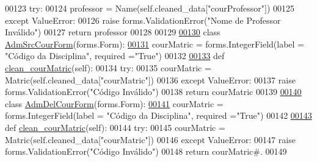 \begin{DoxyCode}
00123         \textcolor{keywordflow}{try}:
00124             professor = Name(self.cleaned\_data[\textcolor{stringliteral}{"courProfessor"}])
00125         \textcolor{keywordflow}{except} ValueError:
00126             \textcolor{keywordflow}{raise} forms.ValidationError(\textcolor{stringliteral}{"Nome de Professor Inválido"})
00127         \textcolor{keywordflow}{return} professor            
00128 
00129 
\hypertarget{Adm_2forms_8py_source_l00130}{}\hyperlink{classAdm_1_1forms_1_1AdmSrcCourForm}{00130} \textcolor{keyword}{class }\hyperlink{classAdm_1_1forms_1_1AdmSrcCourForm}{AdmSrcCourForm}(forms.Form):
\hypertarget{Adm_2forms_8py_source_l00131}{}\hyperlink{classAdm_1_1forms_1_1AdmSrcCourForm_ad1687195ebe49268ac1cccbcaab2cd83}{00131}     courMatric = forms.IntegerField(label = \textcolor{stringliteral}{"Código da Disciplina"}, required =\textcolor{stringliteral}{"True"})
00132 
\hypertarget{Adm_2forms_8py_source_l00133}{}\hyperlink{classAdm_1_1forms_1_1AdmSrcCourForm_a65d37d8a99e8ff4ed69e2f62268810af}{00133}     \textcolor{keyword}{def }\hyperlink{classAdm_1_1forms_1_1AdmSrcCourForm_a65d37d8a99e8ff4ed69e2f62268810af}{clean\_courMatric}(self):
00134         \textcolor{keywordflow}{try}:
00135             courMatric = Matric(self.cleaned\_data[\textcolor{stringliteral}{"courMatric"}])
00136         \textcolor{keywordflow}{except} ValueError:
00137             \textcolor{keywordflow}{raise} forms.ValidationError(\textcolor{stringliteral}{"Código Inválido"})
00138         \textcolor{keywordflow}{return} courMatric
00139 
\hypertarget{Adm_2forms_8py_source_l00140}{}\hyperlink{classAdm_1_1forms_1_1AdmDelCourForm}{00140} \textcolor{keyword}{class }\hyperlink{classAdm_1_1forms_1_1AdmDelCourForm}{AdmDelCourForm}(forms.Form): 
\hypertarget{Adm_2forms_8py_source_l00141}{}\hyperlink{classAdm_1_1forms_1_1AdmDelCourForm_a8ed2bcde12e5bb321960517b3c653b2f}{00141}     courMatric = forms.IntegerField(label = \textcolor{stringliteral}{"Código da Disciplina"}, required =\textcolor{stringliteral}{"True"})
00142 
\hypertarget{Adm_2forms_8py_source_l00143}{}\hyperlink{classAdm_1_1forms_1_1AdmDelCourForm_a29bd1262c5a7db10cbecdc8ba44da63b}{00143}     \textcolor{keyword}{def }\hyperlink{classAdm_1_1forms_1_1AdmDelCourForm_a29bd1262c5a7db10cbecdc8ba44da63b}{clean\_courMatric}(self):
00144         \textcolor{keywordflow}{try}:
00145             courMatric = Matric(self.cleaned\_data[\textcolor{stringliteral}{"courMatric"}])
00146         \textcolor{keywordflow}{except} ValueError:
00147             \textcolor{keywordflow}{raise} forms.ValidationError(\textcolor{stringliteral}{"Código Inválido"})
00148         \textcolor{keywordflow}{return} courMatric\textcolor{comment}{#.}
00149  
\end{DoxyCode}
